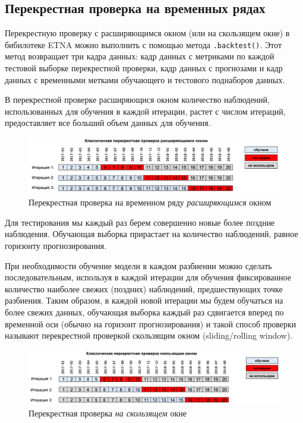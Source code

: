 \documentclass[%
	11pt,
	a4paper,
	utf8,
		]{article}
\begin{document}
\subsection{Перекрестная проверка на временных рядах}

Перекрестную проверку с расширяющимся окном (или на скользящем окне) в бибилотеке ETNA можно выполнить с помощью метода \verb|.backtest()|. Этот метод возвращает три кадра данных: кадр данных с метриками по каждой тестовой выборке перекрестной проверки, кадр данных с прогнозами и кадр данных с временными метками обучающего и тестового поднаборов данных.

В перекрестной проверке расширяющися окном количество наблюдений, использованных для обучения в каждой итерации, растет с числом итераций, предоставляет все больший объем данных для обучения.

\begin{figure}[h]
	\centering
	\includegraphics[scale=0.3]{figures/cross_val_ts.png}
	\caption{ Перекрестная проверка на временном ряду \emph{расширяющимся} окном }\label{fig:cross_val_ts}
\end{figure}

Для тестирования мы каждый раз берем совершенно новые более поздние наблюдения. Обучающая выборка прирастает на количество наблюдений, равное горизонту прогнозирования.

При необходимости обучение модели в каждом разбиении можно сделать последовательным, используя в каждой итерации для обучения фиксированное количество наиболее свежих (поздних) наблюдений, предшествующих точке разбиения. Таким образом, в каждой новой итерации мы будем обучаться на более свежих данных, обучающая выборка каждый раз сдвигается вперед по временной оси (обычно на горизонт прогнозирования) и такой способ проверки называют перекрестной проверкой скользящим окном (sliding/rolling window).

\begin{figure}[h]
	\centering
	\includegraphics[scale=0.3]{figures/cross_val_rol_ts.png}
	\caption{ Перекрестная проверка \emph{на скользящем} окне }\label{fig:cross_val_rol_ts}
\end{figure}
\end{document}
